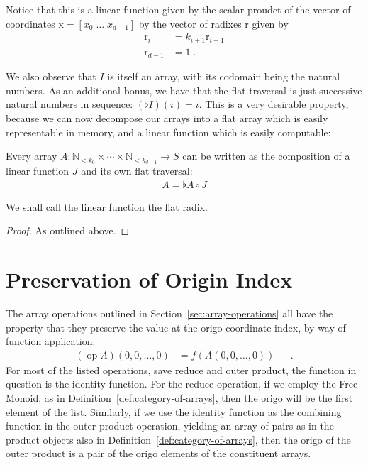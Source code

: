 \documentclass{DIKU-report-variant}
\newcommand\mrm[1]{\mathrm{#1}}
\newcommand\brm[1]{\bm{\mrm{#1}}}
\newcommand\Nat{\mathbb{N}}
\begin{document}
Notice that this is a linear function given by the scalar proudct of the vector of coordinates
\(\brm x = [x_0\; \dots\; x_{d-1}]\) by the vector of radixes \(\brm r\) given by
\begin{align*}
  \brm r_i &= k_{i+1} \brm r_{i+1} \\
  \brm r_{d-1} &= 1 \;.
\end{align*}

We also observe that \(I\) is itself an array, with its codomain being the natural numbers. As an additional
bonus, we have that the flat traversal is just successive natural numbers in sequence: \((\flat I)(i) = i\).
This is a very desirable property, because we can now decompose our arrays into a flat array which is easily
representable in memory, and a linear function which is easily computable:
\begin{theorem}
  \label{the:linear-decompose}
  Every array \(A : \Nat_{<k_0} \times \cdots \times \Nat_{<k_{d-1}} \to S\) can be written as
  the composition of a linear function \(J\) and its own flat traversal:
  \begin{align*}
    A = \flat A \circ J
  \end{align*}
  
  We shall call the linear function the flat radix.
\end{theorem}
\begin{proof}
  As outlined above.
\end{proof}

\section{Preservation of Origin Index}

The array operations outlined in Section~\ref{sec:array-operations} all have the
property that they preserve the value at the origo coordinate index, by way of function
application:
\begin{align*}
  (\operatorname{op} A)(0, 0,\dots,0) &= f(A(0, 0, \dots, 0)) && .
\end{align*}
For most of the listed operations, save reduce and outer product, the function in question is the
identity function. For the reduce operation, if we employ the Free Monoid, as in
Definition~\ref{def:category-of-arrays}, then the origo will be the first element of the list.
Similarly, if we use the identity function as the combining function in the outer product operation,
yielding an array of pairs as in the product objects also in Definition~\ref{def:category-of-arrays},
then the origo of the outer product is a pair of the origo elements of the constituent arrays.
\end{document}
